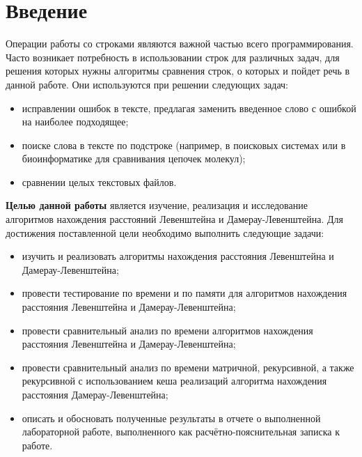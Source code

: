 \chapter*{Введение}

Операции работы со строками являются важной частью всего программирования. Часто возникает потребность в использовании строк для различных задач, для решения которых нужны алгоритмы сравнения строк, о которых и пойдет речь в данной работе.
Они используются при решении следующих задач:
\begin{itemize}
	\item исправлении ошибок в тексте, предлагая заменить введенное слово с ошибкой на наиболее подходящее;
    \item поиске слова в тексте по подстроке (например, в поисковых системах или в биоинформатике для сравнивания цепочек молекул);
    \item сравнении целых текстовых файлов. \newline
\end{itemize}



\textbf{Целью данной работы} является изучение, реализация и исследование алгоритмов нахождения расстояний Левенштейна и Дамерау-Левенштейна.
Для достижения поставленной цели необходимо выполнить следующие задачи:
\begin{itemize}
	\item изучить и реализовать алгоритмы нахождения расстояния Левенштейна и Дамерау-Левенштейна;
    \item провести тестирование по времени и по памяти для алгоритмов нахождения расстояния Левенштейна и Дамерау-Левенштейна;
    \item провести сравнительный анализ по времени алгоритмов нахождения расстояния Левенштейна и Дамерау-Левенштейна;
    \item провести сравнительный анализ по времени матричной, рекурсивной, а также рекурсивной с использованием кеша реализаций алгоритма нахождения расстояния Дамерау-Левенштейна;
	\item описать и обосновать полученные результаты в отчете о выполненной лабораторной работе, выполненного как расчётно-пояснительная записка к работе.
\end{itemize}
